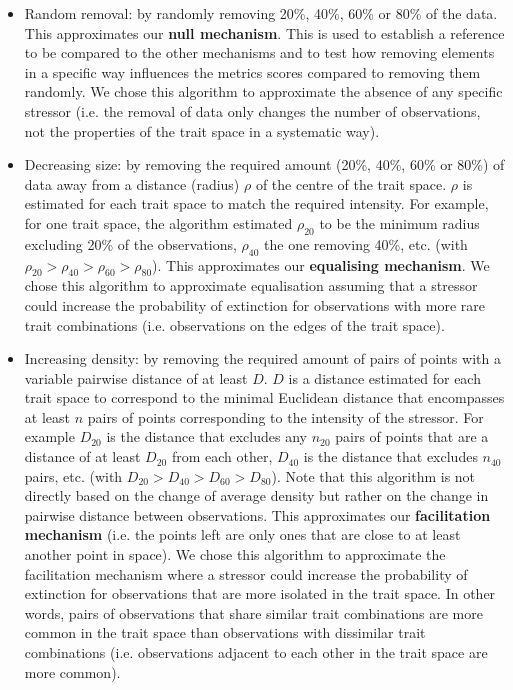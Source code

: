 \documentclass[12pt,letterpaper]{article}
\begin{document}
\begin{itemize}
\item Random removal: by randomly removing 20\%, 40\%, 60\% or 80\% of the data.
This approximates our \textbf{null mechanism}. This is used to establish a reference to be compared to the other mechanisms and to test how removing elements in a specific way influences the metrics scores compared to removing them randomly. We chose this algorithm to approximate the absence of any specific stressor (i.e. the removal of data only changes the number of observations, not the properties of the trait space in a systematic way).

\item Decreasing size: by removing the required amount (20\%, 40\%, 60\% or 80\%) of data away from a distance (radius) $\rho$ of the centre of the trait space.
$\rho$ is estimated for each trait space to match the required intensity. For example, for one trait space, the algorithm estimated $\rho_{20}$ to be the minimum radius excluding 20\% of the observations, $\rho_{40}$ the one removing 40\%, etc. (with $\rho_{20} > \rho_{40} > \rho_{60} > \rho_{80}$).
This approximates our \textbf{equalising mechanism}. 
We chose this algorithm to approximate equalisation assuming that a stressor could increase the probability of extinction for observations with more rare trait combinations (i.e. observations on the edges of the trait space).

\item Increasing density: by removing the required amount of pairs of points with a variable pairwise distance of at least $D$.
$D$ is a distance estimated for each trait space to correspond to the minimal Euclidean distance that encompasses at least $n$ pairs of points corresponding to the intensity of the stressor.
For example $D_{20}$ is the distance that excludes any $n_{20}$ pairs of points that are a distance of at least $D_{20}$ from each other, $D_{40}$ is the distance that excludes $n_{40}$ pairs, etc. (with $D_{20} > D_{40} > D_{60} > D_{80}$).
Note that this algorithm is not directly based on the change of average density but rather on the change in pairwise distance between observations.
This approximates our \textbf{facilitation mechanism} (i.e. the points left are only ones that are close to at least another point in space).
We chose this algorithm to approximate the facilitation mechanism where a stressor could increase the probability of extinction for observations that are more isolated in the trait space.
In other words, pairs of observations that share similar trait combinations are more common in the trait space than observations with dissimilar trait combinations (i.e. observations adjacent to each other in the trait space are more common).


\end{itemize}
\end{document}
